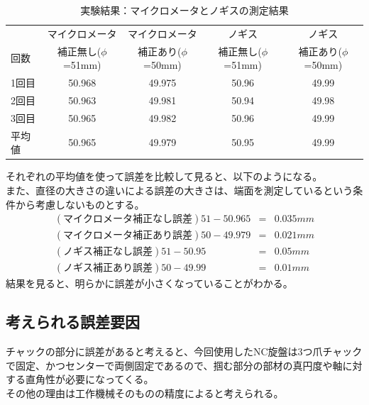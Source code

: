 \documentclass[a4j,twoside,openright,11pt]{jsarticle}
\begin{document}
\begin{table}[htb]
\begin{center}
  \caption{実験結果：マイクロメータとノギスの測定結果}
  \begin{tabular}{|l||c|c|c|c|} \hline
    &マイクロメータ&マイクロメータ&ノギス&ノギス\\
    回数　&補正無し($\phi$=51mm) &補正あり($\phi$=50mm)&補正無し($\phi$=51mm) &補正あり($\phi$=50mm)\\
\hline
    1回目 &50.968               &49.975 & 50.96&49.99 \\
    2回目 &50.963               &49.981 & 50.94&49.98 \\
    3回目 &50.965               &49.982 & 50.96&49.99 \\
\hline
    平均値&50.965               &49.979 &50.95 &49.99 \\
\hline
  \end{tabular}
\end{center}
\end{table}

それぞれの平均値を使って誤差を比較して見ると、以下のようになる。\\
また、直径の大きさの違いによる誤差の大きさは、端面を測定しているという条件から考慮しないものとする。
\begin{eqnarray}
(マイクロメータ補正なし誤差)51 - 50.965 &=& 0.035mm\nonumber\\
(マイクロメータ補正あり誤差)50 - 49.979 &=& 0.021mm\nonumber\\
(ノギス補正なし誤差)51 - 50.95 &=& 0.05mm\nonumber\\
(ノギス補正あり誤差)50 - 49.99 &=& 0.01mm\nonumber
\end{eqnarray}
結果を見ると、明らかに誤差が小さくなっていることがわかる。

\subsection{考えられる誤差要因}
チャックの部分に誤差があると考えると、今回使用したNC旋盤は3つ爪チャックで固定、かつセンターで両側固定であるので、掴む部分の部材の真円度や軸に対する直角性が必要になってくる。\\
その他の理由は工作機械そのものの精度によると考えられる。
\end{document}
